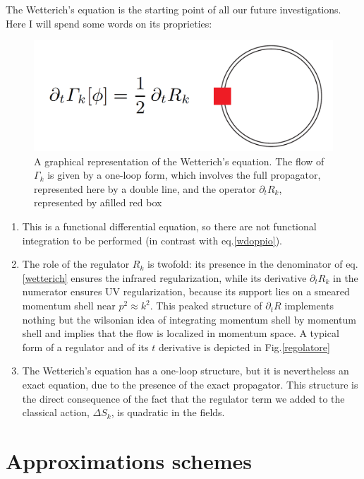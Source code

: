 The Wetterich's equation is the starting point of all our future investigations. Here I will spend some words on its proprieties:
\begin{figure}
\begin{center}
\includegraphics[scale=0.25]{Immagini/flussogamma.png}
\caption{A graphical representation of the Wetterich's equation. The flow of $\Gamma_k$ is given by a one-loop form, which involves the full propagator, represented here by a double line, and the operator $\partial_tR_k$, represented by afilled red box}
\label{fig:gammaflusso}
\end{center}
\end{figure}
\begin{enumerate}
\item This is a functional differential equation, so there are not functional integration to be performed (in contrast with eq.\eqref{wdoppio}).
\item The role of the regulator $R_k$ is twofold: its presence in the denominator of eq.\eqref{wetterich} ensures the infrared regularization, while its derivative $\partial_tR_k$ in the numerator ensures UV regularization, because its support lies on a smeared momentum shell near $p^2 \approx k^2$. This peaked structure of $\partial_tR$ implements nothing but the wilsonian idea of integrating momentum shell by momentum shell and implies that the flow is localized in momentum space. A typical form of a regulator and of its $t$ derivative is depicted in Fig.\ref{regolatore}
\item The Wetterich's equation has a one-loop structure, but it is nevertheless an exact equation, due to the presence of the exact propagator. This structure is the direct consequence of the fact that the regulator term we added to the classical action, $\Delta S_k$, is quadratic in the fields.
\end{enumerate}


\section{Approximations schemes}

